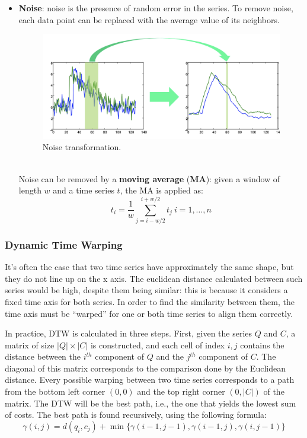 \begin{itemize}
    \item \textbf{Noise}: noise is the presence of random error in the series. To remove noise, each data point can be replaced with the average value of its neighbors.
    \begin{figure}[ht]
        \centering
        \includegraphics[width=0.9\linewidth]{img/noise_trans.png}
        \caption{Noise transformation.}
        \label{fig:noise-trans}
    \end{figure} \\
    Noise can be removed by a \textbf{moving average} (\textbf{MA}): given a window of length $w$ and a time series $t$, the MA is applied as:
    \begin{equation*}
        t_i = \dfrac{1}{w} \sum_{j=i-w/2}^{i + w/2} t_j \ i = 1, \dots , n
    \end{equation*}
\end{itemize}

\subsubsection{Dynamic Time Warping}

It's often the case that two time series have approximately the same shape, but they do not line up on the x axis. The euclidean distance calculated between such series would be high, despite them being similar: this is because it considers a fixed time axis for both series. In order to find the similarity between them, the time axis must be ``warped'' for one or both time series to align them correctly.

In practice, DTW is calculated in three steps. First, given the series $Q$ and $C$, a matrix of size $|Q| \times |C|$ is constructed, and each cell of index $i,j$ contains the distance between the $i^{th}$ component of $Q$ and the $j^{th}$ component of $C$. The diagonal of this matrix corresponds to the comparison done by the Euclidean distance. Every possible warping between two time series corresponds to a path from the bottom left corner $(0,0)$ and the top right corner $(0,|C|)$ of the matrix. The DTW will be the best path, i.e., the one that yields the lowest sum of costs. The best path is found recursively, using the following formula:
\begin{equation*}
    \gamma(i,j) = d(q_i,c_j) + \min\{\gamma(i-1, j-1), \gamma(i-1, j), \gamma(i, j-1)\}
\end{equation*}

